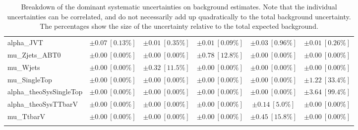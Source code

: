 \begin{sidewaystable}
\begin{center}
\begin{tabular*}{\textwidth}{@{\extracolsep{\fill}}lccccc}
alpha\_JVT         & $\pm 0.07\ [0.13\%] $          & $\pm 0.01\ [0.35\%] $          & $\pm 0.01\ [0.09\%] $          & $\pm 0.03\ [0.96\%] $          & $\pm 0.01\ [0.26\%] $       \\
mu\_Zjets\_ABT0         & $\pm 0.00\ [0.00\%] $          & $\pm 0.00\ [0.00\%] $          & $\pm 0.78\ [12.8\%] $          & $\pm 0.00\ [0.00\%] $          & $\pm 0.00\ [0.00\%] $       \\
mu\_Wjets         & $\pm 0.00\ [0.00\%] $          & $\pm 0.32\ [11.5\%] $          & $\pm 0.00\ [0.00\%] $          & $\pm 0.00\ [0.00\%] $          & $\pm 0.00\ [0.00\%] $       \\
mu\_SingleTop         & $\pm 0.00\ [0.00\%] $          & $\pm 0.00\ [0.00\%] $          & $\pm 0.00\ [0.00\%] $          & $\pm 0.00\ [0.00\%] $          & $\pm 1.22\ [33.4\%] $       \\
alpha\_theoSysSingleTop         & $\pm 0.00\ [0.00\%] $          & $\pm 0.00\ [0.00\%] $          & $\pm 0.00\ [0.00\%] $          & $\pm 0.00\ [0.00\%] $          & $\pm 3.64\ [99.4\%] $       \\
alpha\_theoSysTTbarV         & $\pm 0.00\ [0.00\%] $          & $\pm 0.00\ [0.00\%] $          & $\pm 0.00\ [0.00\%] $          & $\pm 0.14\ [5.0\%] $          & $\pm 0.00\ [0.00\%] $       \\
mu\_TtbarV         & $\pm 0.00\ [0.00\%] $          & $\pm 0.00\ [0.00\%] $          & $\pm 0.00\ [0.00\%] $          & $\pm 0.45\ [15.8\%] $          & $\pm 0.00\ [0.00\%] $       \\
\noalign{\smallskip}\hline\noalign{\smallskip}
\end{tabular*}
\end{center}
\caption[Breakdown of uncertainty on background estimates]{
Breakdown of the dominant systematic uncertainties on background estimates.
Note that the individual uncertainties can be correlated, and do not necessarily add up quadratically to 
the total background uncertainty. The percentages show the size of the uncertainty relative to the total expected background.
\label{table.results.bkgestimate.uncertainties.VRTopAT0_bybkg}}
\end{sidewaystable}
%